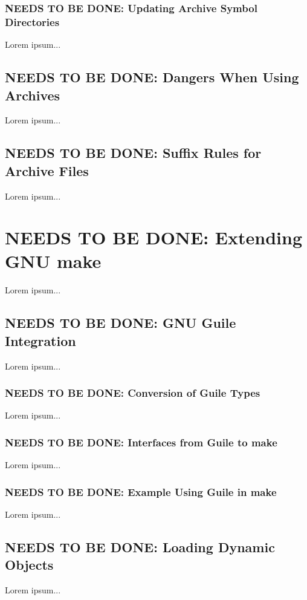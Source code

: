 \documentclass{charun}
\begin{document}
\begin{multicols*}{2}
\color{gray}
\subsubsection{NEEDS TO BE DONE: Updating Archive Symbol Directories}
Lorem ipsum...
\color{black}

\color{gray}
\subsection{NEEDS TO BE DONE: Dangers When Using Archives}
Lorem ipsum...
\color{black}

\color{gray}
\subsection{NEEDS TO BE DONE: Suffix Rules for Archive Files}
Lorem ipsum...
\color{black}


\color{gray}
\section{NEEDS TO BE DONE: Extending GNU make}
Lorem ipsum...
\color{black}


\color{gray}
\subsection{NEEDS TO BE DONE: GNU Guile Integration}
Lorem ipsum...
\color{black}

\color{gray}
\subsubsection{NEEDS TO BE DONE: Conversion of Guile Types}
Lorem ipsum...
\color{black}

\color{gray}
\subsubsection{NEEDS TO BE DONE: Interfaces from Guile to make}
Lorem ipsum...
\color{black}

\color{gray}
\subsubsection{NEEDS TO BE DONE: Example Using Guile in make}
Lorem ipsum...
\color{black}

\color{gray}
\subsection{NEEDS TO BE DONE: Loading Dynamic Objects}
Lorem ipsum...
\color{black}


\end{multicols*}
\end{document}
